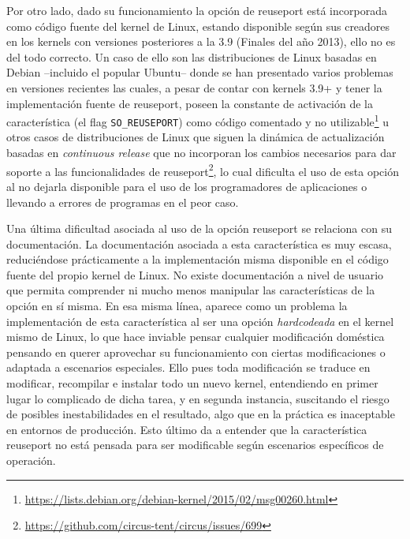 Por otro lado, dado su funcionamiento la opción de reuseport está incorporada como código fuente del kernel de Linux, estando disponible según sus creadores en los kernels con versiones posteriores a la 3.9 (Finales del año 2013), ello no es del todo correcto. Un caso de ello son las distribuciones de Linux basadas en Debian --incluido el popular Ubuntu-- donde se han presentado varios problemas en versiones recientes las cuales, a pesar de contar con kernels 3.9+ y tener la implementación fuente de reuseport, poseen la constante de activación de la característica (el flag \verb=SO_REUSEPORT=) como código comentado y no utilizable\footnote{\url{https://lists.debian.org/debian-kernel/2015/02/msg00260.html}} u otros casos de distribuciones de Linux que siguen la dinámica de actualización basadas en \emph{continuous release} que no incorporan los cambios necesarios para dar soporte a las funcionalidades de reuseport\footnote{\url{https://github.com/circus-tent/circus/issues/699}}, lo cual dificulta el uso de esta opción al no dejarla disponible para el uso de los programadores de aplicaciones o llevando a errores de programas en el peor caso.

Una última dificultad asociada al uso de la opción reuseport se relaciona con su documentación. La documentación asociada a esta característica es muy escasa, reduciéndose prácticamente a la implementación misma disponible en el código fuente del propio kernel de Linux. No existe documentación a nivel de usuario que permita comprender ni mucho menos manipular las características de la opción en sí misma. En esa misma línea, aparece como un problema la implementación de esta característica al ser una opción \emph{hardcodeada} en el kernel mismo de Linux, lo que hace inviable pensar cualquier modificación doméstica pensando en querer aprovechar su funcionamiento con ciertas modificaciones o adaptada a escenarios especiales. Ello pues toda modificación se traduce en modificar, recompilar e instalar todo un nuevo kernel, entendiendo en primer lugar lo complicado de dicha tarea, y en segunda instancia, suscitando el riesgo de posibles inestabilidades en el resultado, algo que en la práctica es inaceptable en entornos de producción. Esto último da a entender que la característica reuseport no está pensada para ser modificable según escenarios específicos de operación.
